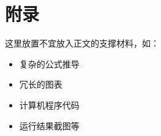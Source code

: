 \chapter*{附\hspace{2em}录}

这里放置不宜放入正文的支撑材料，如：
\begin{itemize}
    \item 复杂的公式推导
    \item 冗长的图表
    \item 计算机程序代码
    \item 运行结果截图等
\end{itemize}
